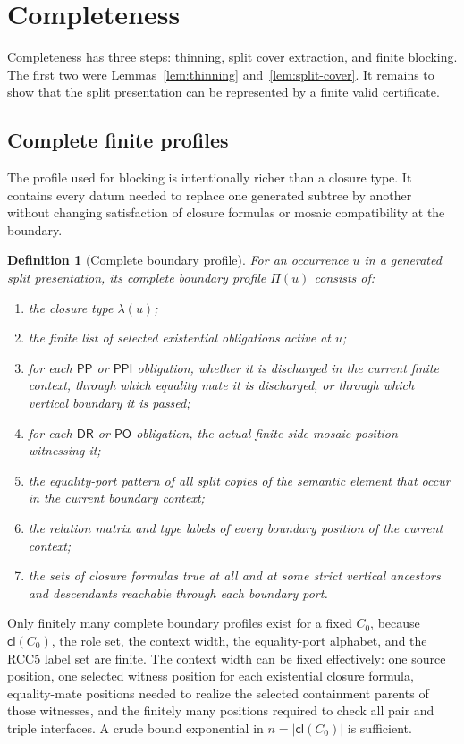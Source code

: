 \documentclass[11pt]{article}
\newtheorem{definition}[theorem]{Definition}
\newcommand{\DR}{\mathsf{DR}}
\newcommand{\PO}{\mathsf{PO}}
\newcommand{\PP}{\mathsf{PP}}
\newcommand{\PPI}{\mathsf{PPI}}
\newcommand{\Cl}{\mathsf{cl}}
\begin{document}
\section{Completeness}

Completeness has three steps: thinning, split cover extraction, and finite blocking.  The first two were Lemmas~\ref{lem:thinning} and~\ref{lem:split-cover}.  It remains to show that the split presentation can be represented by a finite valid certificate.

\subsection{Complete finite profiles}

The profile used for blocking is intentionally richer than a closure type.  It contains every datum needed to replace one generated subtree by another without changing satisfaction of closure formulas or mosaic compatibility at the boundary.

\begin{definition}[Complete boundary profile]\label{def:complete-profile}
For an occurrence $u$ in a generated split presentation, its complete boundary profile $\Pi(u)$ consists of:
\begin{enumerate}[label=(B\arabic*)]
\item the closure type $\lambda(u)$;
\item the finite list of selected existential obligations active at $u$;
\item for each $\PP$ or $\PPI$ obligation, whether it is discharged in the current finite context, through which equality mate it is discharged, or through which vertical boundary it is passed;
\item for each $\DR$ or $\PO$ obligation, the actual finite side mosaic position witnessing it;
\item the equality-port pattern of all split copies of the semantic element that occur in the current boundary context;
\item the relation matrix and type labels of every boundary position of the current context;
\item the sets of closure formulas true at all and at some strict vertical ancestors and descendants reachable through each boundary port.
\end{enumerate}
\end{definition}

Only finitely many complete boundary profiles exist for a fixed $C_0$, because $\Cl(C_0)$, the role set, the context width, the equality-port alphabet, and the RCC5 label set are finite.  The context width can be fixed effectively: one source position, one selected witness position for each existential closure formula, equality-mate positions needed to realize the selected containment parents of those witnesses, and the finitely many positions required to check all pair and triple interfaces.  A crude bound exponential in $n=|\Cl(C_0)|$ is sufficient.
\end{document}
